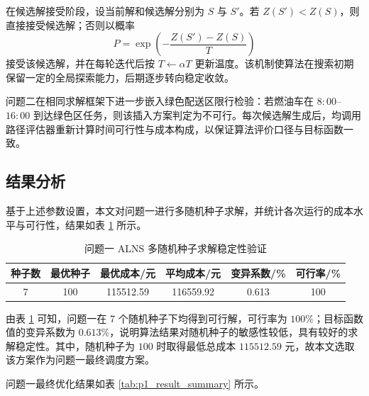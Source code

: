 \documentclass[withoutpreface,bwprint]{cumcmthesis} %
\begin{document}
在候选解接受阶段，设当前解和候选解分别为 $S$ 与 $S'$。若 $Z(S')<Z(S)$，则直接接受候选解；否则以概率
\[
P=\exp\left(-\frac{Z(S')-Z(S)}{T}\right)
\]
接受该候选解，并在每轮迭代后按 $T\leftarrow \alpha T$ 更新温度。该机制使算法在搜索初期保留一定的全局探索能力，后期逐步转向稳定收敛。

问题二在相同求解框架下进一步嵌入绿色配送区限行检验：若燃油车在 $8{:}00$--$16{:}00$ 到达绿色区任务，则该插入方案判定为不可行。每次候选解生成后，均调用路径评估器重新计算时间可行性与成本构成，以保证算法评价口径与目标函数一致。


\subsection{结果分析}

基于上述参数设置，本文对问题一进行多随机种子求解，并统计各次运行的成本水平与可行性，结果如表 \ref{tab:p1_alns_stability} 所示。

\begin{table}[H]
\centering
\caption{问题一 ALNS 多随机种子求解稳定性验证}
\label{tab:p1_alns_stability}
\renewcommand{\arraystretch}{1.15}
\setlength{\tabcolsep}{6pt}
\small
\begin{tabular}{c c c c c c}
\toprule
\rowcolor{tablehead}
\textbf{种子数} & \textbf{最优种子} & \textbf{最优成本/元} & \textbf{平均成本/元} & \textbf{变异系数/\%} & \textbf{可行率/\%} \\
\midrule
7 & 100 & 115512.59 & 116559.92 & 0.613 & 100 \\
\bottomrule
\end{tabular}
\end{table}

由表 \ref{tab:p1_alns_stability} 可知，问题一在 7 个随机种子下均得到可行解，可行率为 $100\%$；目标函数值的变异系数为 $0.613\%$，说明算法结果对随机种子的敏感性较低，具有较好的求解稳定性。其中，随机种子为 $100$ 时取得最低总成本 $115512.59$ 元，故本文选取该方案作为问题一最终调度方案。

问题一最终优化结果如表 \ref{tab:p1_result_summary} 所示。
\end{document}
